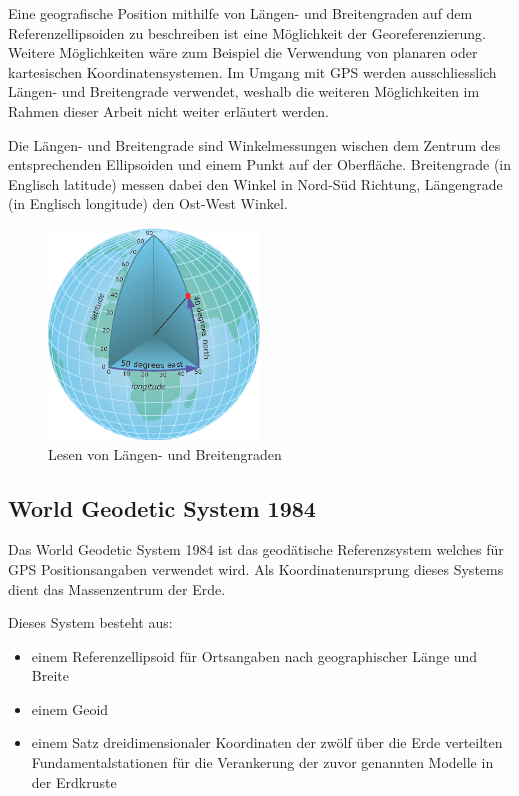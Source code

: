 Eine geografische Position mithilfe von Längen- und Breitengraden auf dem Referenzellipsoiden zu beschreiben ist eine Möglichkeit der Georeferenzierung. Weitere Möglichkeiten wäre zum Beispiel die Verwendung von planaren oder kartesischen Koordinatensystemen. Im Umgang mit GPS werden ausschliesslich Längen- und Breitengrade verwendet, weshalb die weiteren Möglichkeiten im Rahmen dieser Arbeit nicht weiter erläutert werden.

Die Längen- und Breitengrade sind Winkelmessungen wischen dem Zentrum des entsprechenden Ellipsoiden und einem Punkt auf der Oberfläche. Breitengrade (in Englisch latitude) messen dabei den Winkel in Nord-Süd Richtung, Längengrade (in Englisch longitude) den Ost-West Winkel. \cite{georef}

\begin{figure}[h]
  \centering
  \includegraphics[width=0.5\textwidth]{images/longlat.png}
  \caption[Längen- und Breitengrade]{Lesen von Längen- und Breitengraden \cite{georef}}
  \label{fig:longlat}
\end{figure}

\subsection{World Geodetic System 1984}
Das World Geodetic System 1984 ist das geodätische Referenzsystem welches für GPS Positionsangaben verwendet wird. Als Koordinatenursprung dieses Systems dient das Massenzentrum der Erde. 

Dieses System besteht aus:
\begin{itemize}
	\item einem Referenzellipsoid für Ortsangaben nach geographischer Länge und Breite
	\item einem Geoid
	\item einem Satz dreidimensionaler Koordinaten der zwölf über die Erde verteilten Fundamentalstationen für die Verankerung der zuvor genannten Modelle in der Erdkruste \cite{wsg84}
\end{itemize}

